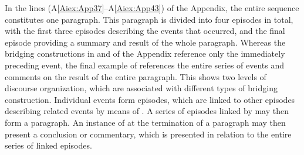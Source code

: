 \documentclass[output=paper]{LSP/langsci}
\begin{document}
	In the lines (A\ref{Aiex:App37}--A\ref{Aiex:App43}) of the Appendix, the entire sequence constitutes one paragraph. This paragraph is divided into four episodes in total, with the first three episodes describing the events that occurred, and the final episode providing a summary and result of the whole paragraph. Whereas the bridging constructions in  and  of the Appendix reference only the immediately preceding event, the final example of  references the entire series of events and comments on the result of the entire paragraph. This shows two levels of discourse organization, which are associated with different types of bridging construction. Individual events form episodes, which are linked to other episodes describing related events by means of . A series of episodes linked by  may then form a paragraph. An instance of  at the termination of a paragraph may then present a conclusion or commentary, which is presented in relation to the entire series of linked episodes.
	
\end{document}
